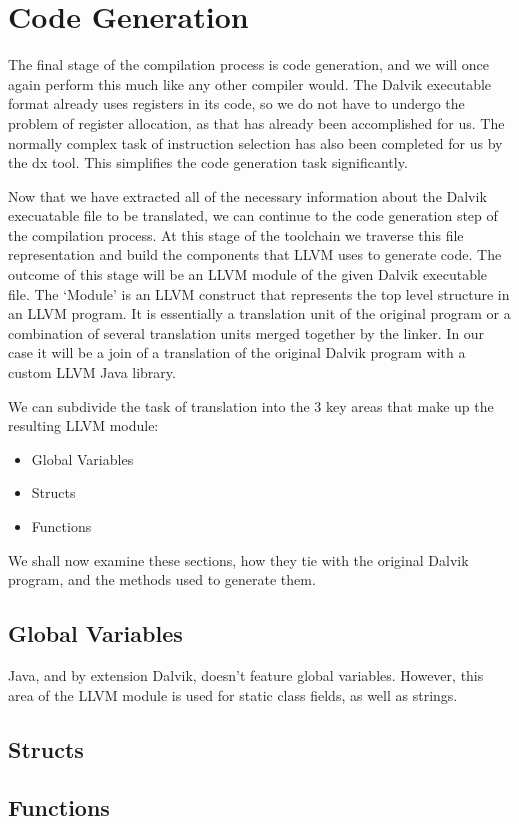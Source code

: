 \section{Code Generation}
\label{sec:codegen}

The final stage of the compilation process is code generation, and we will once again perform this much like any other compiler would. The Dalvik executable format already uses registers in its code, so we do not have to undergo the problem of register allocation, as that has already been accomplished for us. The normally complex task of instruction selection has also been completed for us by the dx tool. This simplifies the code generation task significantly.

Now that we have extracted all of the necessary information about the Dalvik execuatable file to be translated, we can continue to the code generation step of the compilation process. At this stage of the toolchain we traverse this file representation and build the components that LLVM uses to generate code. The outcome of this stage will be an LLVM module of the given Dalvik executable file. The `Module' is an LLVM construct that represents the top level structure in an LLVM program. It is essentially a translation unit of the original program or a combination of several translation units merged together by the linker. In our case it will be a join of a translation of the original Dalvik program with a custom LLVM Java library.

We can subdivide the task of translation into the 3 key areas that make up the resulting LLVM module:

\begin{itemize}
	\item Global Variables
	\item Structs
	\item Functions
\end{itemize}

We shall now examine these sections, how they tie with the original Dalvik program, and the methods used to generate them.

\subsection*{Global Variables}

Java, and by extension Dalvik, doesn't feature global variables. However, this area of the LLVM module is used for static class fields, as well as strings.

\subsection*{Structs}


\subsection*{Functions}


